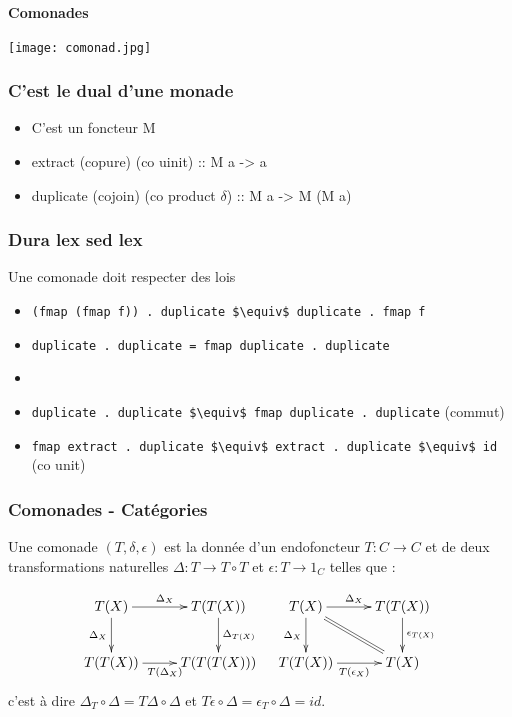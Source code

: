 \documentclass{beamer}
\begin{document}
\begin{frame}
\begin{center}
\textbf{Comonades}
\end{center}

\begin{center}
\texttt{[image: comonad.jpg]}
\end{center}
\end{frame}

\begin{frame}
\frametitle{C'est le dual d'une monade}

\begin{itemize}
\item C'est un foncteur M
\item extract (copure) (co uinit) :: M a -> a
\item duplicate (cojoin) (co product $\delta$) :: M a -> M (M a)
\end{itemize}
\end{frame}

\begin{frame}
\frametitle{Dura lex sed lex}
\begin{alertblock}{Une comonade doit respecter des lois}
\begin{itemize}
\item \verb!(fmap (fmap f)) . duplicate $\equiv$ duplicate . fmap f!
\item \verb!duplicate . duplicate = fmap duplicate . duplicate!
\item[] \ 
\item \verb!duplicate . duplicate $\equiv$ fmap duplicate . duplicate! (commut)
\item \verb!fmap extract . duplicate $\equiv$ extract . duplicate $\equiv$ id! (co unit)
\end{itemize}
\end{alertblock}
\end{frame}


\begin{frame}
\frametitle{Comonades - Catégories}
Une comonade $(T, \delta, \epsilon)$ est la donnée d'un
endofoncteur $T : C \rightarrow C$ et de deux
transformations naturelles $\Delta : T \rightarrow T\circ T$ et $\epsilon : T \rightarrow 1_C$ telles que :

\[
\begin{array}{cc}
\xymatrix{
T(X) \ar[r]^{\Delta_X} \ar[d]_{\Delta_X} & T(T(X)) \ar[d]^{\Delta_{T(X)}} \\
T(T(X)) \ar[r]_{T(\Delta_X)} & T(T(T(X))) \\
}
&
\xymatrix{
T(X) \ar[d]_{\Delta_X} \ar[r]^{\Delta_X}  \ar@{=}[dr] & T(T(X))   \ar[d]^{\epsilon_{T(X)}} \\
T(T(X)) \ar[r]_{T(\epsilon_X)} & T(X) \\
}
\end{array}
\]
c'est à dire
$\Delta_T \circ \Delta = T \Delta \circ \Delta$
et
$T \epsilon \circ \Delta = \epsilon_T \circ \Delta = id$.
\end{frame}
\end{document}
